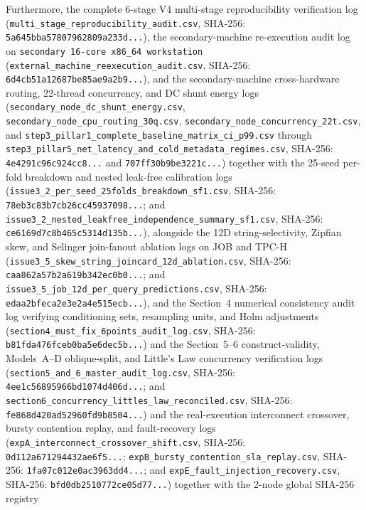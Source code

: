 \documentclass[10pt,a4paper]{article}
\begin{document}
Furthermore, the complete 6-stage V4 multi-stage reproducibility verification log (\texttt{multi\_stage\_reproducibility\_audit.csv}, SHA-256: \texttt{5a645bba57807962809a233d...}), the secondary-machine re-execution audit log on \texttt{secondary 16-core x86\_64 workstation} (\texttt{external\_machine\_reexecution\_audit.csv}, SHA-256: \texttt{6d4cb51a12687be85ae9a2b9...}), and the secondary-machine cross-hardware routing, 22-thread concurrency, and DC shunt energy logs (\texttt{secondary\_node\_dc\_shunt\_energy.csv}, \texttt{secondary\_node\_cpu\_routing\_30q.csv}, \texttt{secondary\_node\_concurrency\_22t.csv}, and \texttt{step3\_pillar1\_complete\_baseline\_matrix\_ci\_p99.csv} through \texttt{step3\_pillar5\_net\_latency\_and\_cold\_metadata\_regimes.csv}, SHA-256: \texttt{4e4291c96c924cc8...} and \texttt{707ff30b9be3221c...}) together with the 25-seed per-fold breakdown and nested leak-free calibration logs (\texttt{issue3\_2\_per\_seed\_25folds\_breakdown\_sf1.csv}, SHA-256: \texttt{78eb3c83b7cb26cc45937098...}; and \texttt{issue3\_2\_nested\_leakfree\_independence\_summary\_sf1.csv}, SHA-256: \texttt{ce6169d7c8b465c5314d135b...}), alongside the 12D string-selectivity, Zipfian skew, and Selinger join-fanout ablation logs on JOB and TPC-H (\texttt{issue3\_5\_skew\_string\_joincard\_12d\_ablation.csv}, SHA-256: \texttt{caa862a57b2a619b342ec0b0...}; and \texttt{issue3\_5\_job\_12d\_per\_query\_predictions.csv}, SHA-256: \texttt{edaa2bfeca2e3e2a4e515ecb...}), and the Section~4 numerical consistency audit log verifying conditioning sets, resampling units, and Holm adjustments (\texttt{section4\_must\_fix\_6points\_audit\_log.csv}, SHA-256: \texttt{b81fda476fceb0ba5e6dec5b...}) and the Section~5--6 construct-validity, Models~A--D oblique-split, and Little's Law concurrency verification logs (\texttt{section5\_and\_6\_master\_audit\_log.csv}, SHA-256: \texttt{4ee1c56895966bd1074d406d...}; and \texttt{section6\_concurrency\_littles\_law\_reconciled.csv}, SHA-256: \texttt{fe868d420ad52960fd9b8504...}) and the real-execution interconnect crossover, bursty contention replay, and fault-recovery logs (\texttt{expA\_interconnect\_crossover\_shift.csv}, SHA-256: \texttt{0d112a671294432ae6f5...}; \texttt{expB\_bursty\_contention\_sla\_replay.csv}, SHA-256: \texttt{1fa07c012e0ac3963dd4...}; and \texttt{expE\_fault\_injection\_recovery.csv}, SHA-256: \texttt{bfd0db2510772ce05d77...}) together with the 2-node global SHA-256 registry 
\end{document}
